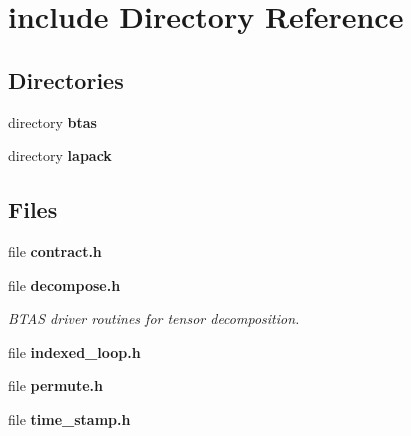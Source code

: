 \section{include Directory Reference}
\label{dir_d44c64559bbebec7f509842c48db8b23}
\subsection*{Directories}
\begin{DoxyCompactItemize}
\item 
directory {\bf btas}
\item 
directory {\bf lapack}
\end{DoxyCompactItemize}
\subsection*{Files}
\begin{DoxyCompactItemize}
\item 
file {\bf contract.\-h}
\item 
file {\bf decompose.\-h}
\begin{DoxyCompactList}\small\item\em B\-T\-A\-S driver routines for tensor decomposition. \end{DoxyCompactList}\item 
file {\bf indexed\-\_\-loop.\-h}
\item 
file {\bf permute.\-h}
\item 
file {\bf time\-\_\-stamp.\-h}
\end{DoxyCompactItemize}
